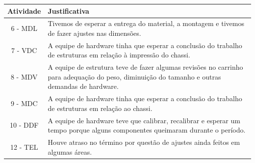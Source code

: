 \begin{landscape}
\begin{longtable}{|c|p{12cm}|}
    \hline
    \textbf{Atividade} & \textbf{Justificativa} \\ \hline
    \endhead

    \hline
    \endfoot

    \hline
    \endlastfoot

    6 - MDL & Tivemos de esperar a entrega do material, a montagem e tivemos de fazer ajustes nas dimensões. \\ \hline
    7 - VDC & A equipe de hardware tinha que esperar a conclusão do trabalho de estruturas em relação à impressão do chassi. \\ \hline
    8 - MDV & A equipe de estrutura teve de fazer algumas revisões no carrinho para adequação do peso, diminuição do tamanho e outras demandas de hardware. \\ \hline
    9 - MDC & A equipe de hardware tinha que esperar a conclusão do trabalho de estruturas em relação ao chassi. \\ \hline
    10 - DDF & A equipe de hardware teve que calibrar, recalibrar e esperar um tempo porque alguns componentes queimaram durante o período. \\ \hline
    12 - TEL & Houve atraso no término por questão de ajustes ainda feitos em algumas áreas. \\ \hline
\end{longtable}

\end{landscape}
